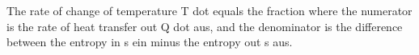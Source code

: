 The rate of change of temperature T dot equals the fraction where the numerator is the rate of heat transfer out Q dot aus, and the denominator is the difference between the entropy in s ein minus the entropy out s aus.